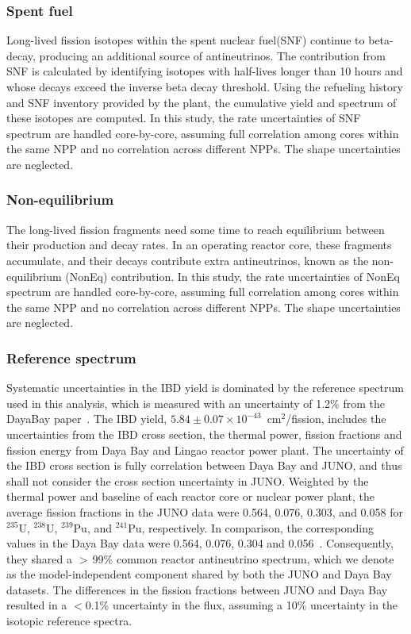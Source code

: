 \subsubsection{Spent fuel}
Long-lived fission isotopes within the spent nuclear fuel(SNF) continue to beta-decay, producing an additional source of antineutrinos. The contribution from SNF is calculated by identifying isotopes with half-lives longer than 10 hours and whose decays exceed the inverse beta decay threshold. Using the refueling history and SNF inventory provided by the plant, the cumulative yield and spectrum of these isotopes are computed. 
In this study, the rate uncertainties of SNF spectrum are handled core-by-core, assuming full correlation among cores within the same NPP and no correlation across different NPPs. The shape uncertainties are neglected.


\subsubsection{Non-equilibrium}
The long-lived fission fragments need some time to reach equilibrium between their production and decay rates. 
In an operating reactor core, these fragments accumulate, and their decays contribute extra antineutrinos, known as the non-equilibrium (NonEq) contribution.
In this study, the rate uncertainties of NonEq spectrum are handled core-by-core, assuming full correlation among cores within the same NPP and no correlation across different NPPs. The shape uncertainties are neglected.

\subsubsection{Reference spectrum}
Systematic uncertainties in the IBD yield is dominated by the reference spectrum used in this analysis, which is measured with an uncertainty of 1.2\% from the DayaBay paper~\cite{DYB:Flux2025}.
The IBD yield,  $5.84 \pm 0.07 \times 10^{-43}$~cm$^2$/fission, includes the uncertainties from the IBD cross section, the thermal power, fission fractions and fission energy from Daya Bay and Lingao reactor power plant.
The uncertainty of the IBD cross section is fully correlation between Daya Bay and JUNO, and thus shall not consider the cross section uncertainty in JUNO.
Weighted by the thermal power and baseline of each reactor core or nuclear power plant, the average fission fractions in the JUNO data were 0.564, 0.076, 0.303, and 0.058 for $^{235}$U, $^{238}$U, $^{239}$Pu, and $^{241}$Pu, respectively. In comparison, the corresponding values in the Daya Bay data were 0.564, 0.076, 0.304 and 0.056~\cite{DYB:Flux2025}.
Consequently, they shared a $>$\,99\% common reactor antineutrino spectrum, which we denote as the model-independent component shared by both the JUNO and Daya Bay datasets.
The differences in the fission fractions between JUNO and Daya Bay resulted in a $<$0.1\% uncertainty in the flux, assuming a 10\% uncertainty in the isotopic reference spectra.


